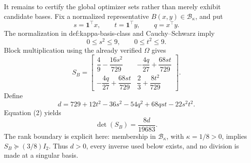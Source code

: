 It remains to certify the global optimizer sets rather than merely exhibit candidate bases.  Fix a normalized representative \(B(x,y)\in\mathcal B_\kappa\), and put
\[
 s=\mathbf 1^{\top}x,
 \qquad t=\mathbf 1^{\top}y,
 \qquad q=x^{\top}y.
\]
The normalization in def:kappa-basis-class and Cauchy--Schwarz imply
\[
 0\le s^2\le9,
 \qquad 0\le t^2\le9.
 \tag{1}
\]
Block multiplication using the already verified \(\Omega\) gives
\[
 S_B=
 \begin{bmatrix}
 \dfrac49-\dfrac{16s^2}{729}&-\dfrac{4q}{27}+\dfrac{68st}{729}\\[4pt]
 -\dfrac{4q}{27}+\dfrac{68st}{729}&\dfrac23+\dfrac{8t^2}{729}
 \end{bmatrix}.
 \tag{2}
\]
Define
\[
 d=729+12t^2-36s^2-54q^2+68qst-22s^2t^2.
 \tag{3}
\]
Equation (2) yields
\[
 \det(S_B)=\frac{8d}{19683}.
 \tag{4}
\]
The rank boundary is explicit here: membership in \(\mathcal B_\kappa\), with \(\kappa=1/8>0\), implies \(S_B\succeq(3/8)I_2\).  Thus \(d>0\), every inverse used below exists, and no division is made at a singular basis.

